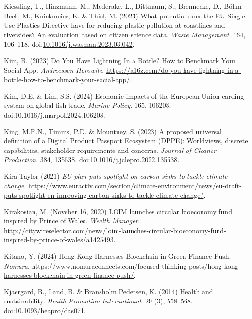 \documentclass[
  letterpaper,
  DIV=11,
  numbers=noendperiod]{scrartcl}
\newlength{\cslhangindent}
\newenvironment{CSLReferences}[2] %
 {\begin{list}{}{%
  \setlength{\itemindent}{0pt}
  \setlength{\leftmargin}{0pt}
  \setlength{\parsep}{0pt}
  \ifodd #1
   \setlength{\leftmargin}{\cslhangindent}
   \setlength{\itemindent}{-1\cslhangindent}
  \fi
  \setlength{\itemsep}{#2\baselineskip}}}
 {\end{list}}
\begin{document}
\begin{CSLReferences}{0}{1}
Kiessling, T., Hinzmann, M., Mederake, L., Dittmann, S., Brennecke, D.,
Böhm-Beck, M., Knickmeier, K. \& Thiel, M. (2023) What potential does
the {EU Single-Use Plastics Directive} have for reducing plastic
pollution at coastlines and riversides? {An} evaluation based on citizen
science data. \emph{Waste Management}. 164, 106--118.
doi:\href{https://doi.org/10.1016/j.wasman.2023.03.042}{10.1016/j.wasman.2023.03.042}.

Kim, B. (2023) Do {You Have Lightning In} a {Bottle}? {How} to
{Benchmark Your Social App}. \emph{Andreessen Horowitz}.
\url{https://a16z.com/do-you-have-lightning-in-a-bottle-how-to-benchmark-your-social-app/}.

Kim, D.E. \& Lim, S.S. (2024) Economic impacts of the {European Union}
carding system on global fish trade. \emph{Marine Policy}. 165, 106208.
doi:\href{https://doi.org/10.1016/j.marpol.2024.106208}{10.1016/j.marpol.2024.106208}.

King, M.R.N., Timms, P.D. \& Mountney, S. (2023) A proposed universal
definition of a {Digital Product Passport Ecosystem} ({DPPE}):
{Worldviews}, discrete capabilities, stakeholder requirements and
concerns. \emph{Journal of Cleaner Production}. 384, 135538.
doi:\href{https://doi.org/10.1016/j.jclepro.2022.135538}{10.1016/j.jclepro.2022.135538}.

Kira Taylor (2021) \emph{{EU} plan puts spotlight on carbon sinks to
tackle climate change}.
\url{https://www.euractiv.com/section/climate-environment/news/eu-draft-puts-spotlight-on-improving-carbon-sinks-to-tackle-climate-change/}.

Kirakosian, M. (Noveber 16, 2020) {LOIM} launches circular bioeconomy
fund inspired by {Prince} of {Wales}. \emph{Wealth Manager}.
\url{http://citywireselector.com/news/loim-launches-circular-bioeconomy-fund-inspired-by-prince-of-wales/a1425493}.

Kitano, Y. (2024) Hong {Kong Harnesses Blockchain} in {Green Finance
Push}. \emph{Nomura}.
\url{https://www.nomuraconnects.com/focused-thinking-posts/hong-kong-harnesses-blockchain-in-green-finance-push/}.

Kjaergard, B., Land, B. \& Bransholm Pedersen, K. (2014) Health and
sustainability. \emph{Health Promotion International}. 29 (3), 558--568.
doi:\href{https://doi.org/10.1093/heapro/das071}{10.1093/heapro/das071}.


\end{CSLReferences}
\end{document}
